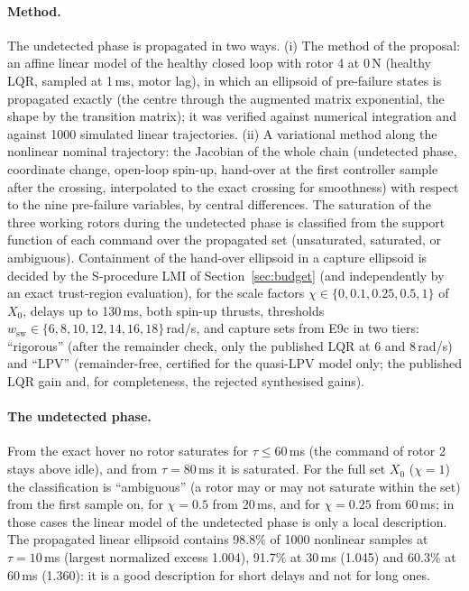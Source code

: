 \paragraph{Method.} The undetected phase is propagated in two ways. (i) The method of the proposal: an affine linear model of the healthy closed loop with rotor 4 at 0\,N (healthy LQR, sampled at 1\,ms, motor lag), in which an ellipsoid of pre-failure states is propagated exactly (the centre through the augmented matrix exponential, the shape by the transition matrix); it was verified against numerical integration and against 1000 simulated linear trajectories. (ii) A variational method along the nonlinear nominal trajectory: the Jacobian of the whole chain (undetected phase, coordinate change, open-loop spin-up, hand-over at the first controller sample after the crossing, interpolated to the exact crossing for smoothness) with respect to the nine pre-failure variables, by central differences. The saturation of the three working rotors during the undetected phase is classified from the support function of each command over the propagated set (unsaturated, saturated, or ambiguous). Containment of the hand-over ellipsoid in a capture ellipsoid is decided by the S-procedure LMI of Section~\ref{sec:budget} (and independently by an exact trust-region evaluation), for the scale factors $\chi\in\{0,0.1,0.25,0.5,1\}$ of $X_0$, delays up to 130\,ms, both spin-up thrusts, thresholds $w_{\mathrm{sw}}\in\{6,8,10,12,14,16,18\}$\,rad/s, and capture sets from E9c in two tiers: ``rigorous'' (after the remainder check, only the published LQR at 6 and 8\,rad/s) and ``LPV'' (remainder-free, certified for the quasi-LPV model only; the published LQR gain and, for completeness, the rejected synthesised gains).

\paragraph{The undetected phase.} From the exact hover no rotor saturates for $\tau\le60$\,ms (the command of rotor 2 stays above idle), and from $\tau=80$\,ms it is saturated. For the full set $X_0$ ($\chi=1$) the classification is ``ambiguous'' (a rotor may or may not saturate within the set) from the first sample on, for $\chi=0.5$ from 20\,ms, and for $\chi=0.25$ from 60\,ms; in those cases the linear model of the undetected phase is only a local description. The propagated linear ellipsoid contains 98.8\% of 1000 nonlinear samples at $\tau=10$\,ms (largest normalized excess 1.004), 91.7\% at 30\,ms (1.045) and 60.3\% at 60\,ms (1.360): it is a good description for short delays and not for long ones.

